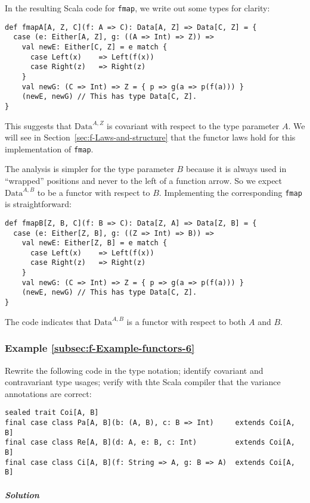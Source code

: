 In the resulting Scala code for \lstinline!fmap!, we write out some
types for clarity:
\begin{lstlisting}
def fmapA[A, Z, C](f: A => C): Data[A, Z] => Data[C, Z] = {
  case (e: Either[A, Z], g: ((A => Int) => Z)) =>
    val newE: Either[C, Z] = e match {
      case Left(x)    => Left(f(x))
      case Right(z)   => Right(z)
    }
    val newG: (C => Int) => Z = { p => g(a => p(f(a))) }
    (newE, newG) // This has type Data[C, Z].
}
\end{lstlisting}
This suggests that $\text{Data}^{A,Z}$ is covariant with respect
to the type parameter $A$. We will see in Section~\ref{sec:f-Laws-and-structure}
that the functor laws hold for this implementation of \lstinline!fmap!.

The analysis is simpler for the type parameter $B$ because it is
always used in ``wrapped'' positions and never to the left of a
function arrow. So we expect $\text{Data}^{A,B}$ to be a functor
with respect to $B$. Implementing the corresponding \lstinline!fmap!
is straightforward:
\begin{lstlisting}
def fmapB[Z, B, C](f: B => C): Data[Z, A] => Data[Z, B] = {
  case (e: Either[Z, B], g: ((Z => Int) => B)) =>
    val newE: Either[Z, B] = e match {
      case Left(x)    => Left(f(x))
      case Right(z)   => Right(z)
    }
    val newG: (C => Int) => Z = { p => g(a => p(f(a))) }
    (newE, newG) // This has type Data[C, Z].
}
\end{lstlisting}

The code indicates that $\text{Data}^{A,B}$ is a functor with respect
to both $A$ and $B$.

\subsubsection{Example \label{subsec:f-Example-functors-6}\ref{subsec:f-Example-functors-6}}

Rewrite the following code in the type notation; identify covariant
and contravariant type usages; verify with thte Scala compiler that
the variance annotations are correct:
\begin{lstlisting}
sealed trait Coi[A, B]
final case class Pa[A, B](b: (A, B), c: B => Int)     extends Coi[A, B]
final case class Re[A, B](d: A, e: B, c: Int)         extends Coi[A, B]
final case class Ci[A, B](f: String => A, g: B => A)  extends Coi[A, B]
\end{lstlisting}


\subparagraph{Solution}

